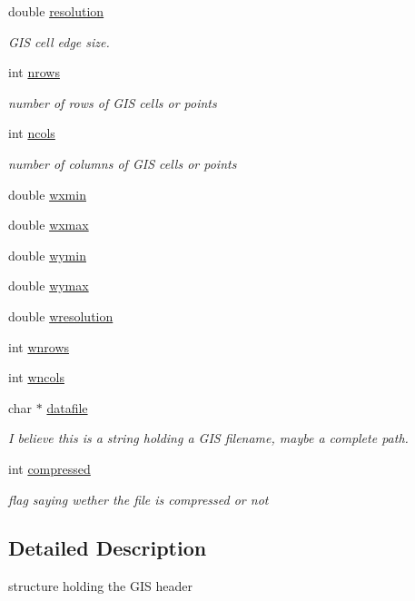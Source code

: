 \begin{CompactItemize}
double \hyperlink{structGis__Head_o6}{resolution}
\begin{CompactList}\small\item\em GIS cell edge size. \item\end{CompactList}\item 
int \hyperlink{structGis__Head_o7}{nrows}
\begin{CompactList}\small\item\em number of rows of GIS cells or points \item\end{CompactList}\item 
int \hyperlink{structGis__Head_o8}{ncols}
\begin{CompactList}\small\item\em number of columns of GIS cells or points \item\end{CompactList}\item 
double \hyperlink{structGis__Head_o9}{wxmin}
\item 
double \hyperlink{structGis__Head_o10}{wxmax}
\item 
double \hyperlink{structGis__Head_o11}{wymin}
\item 
double \hyperlink{structGis__Head_o12}{wymax}
\item 
double \hyperlink{structGis__Head_o13}{wresolution}
\item 
int \hyperlink{structGis__Head_o14}{wnrows}
\item 
int \hyperlink{structGis__Head_o15}{wncols}
\item 
char $\ast$ \hyperlink{structGis__Head_o16}{datafile}
\begin{CompactList}\small\item\em I believe this is a string holding a GIS filename, maybe a complete path. \item\end{CompactList}\item 
int \hyperlink{structGis__Head_o17}{compressed}
\begin{CompactList}\small\item\em flag saying wether the file is compressed or not \item\end{CompactList}\end{CompactItemize}


\subsection{Detailed Description}
structure holding the GIS header 



